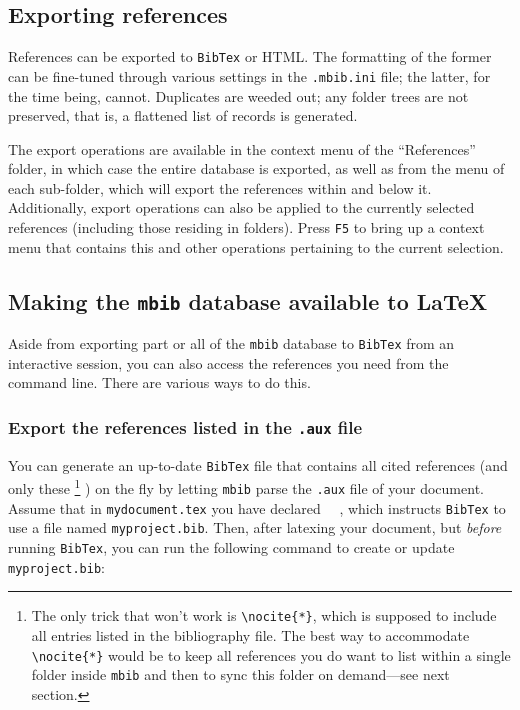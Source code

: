 \documentclass[10pt]{article}
\newcommand*{\mbib}{\texttt{mbib}\xspace}
\newcommand*{\bibtex}{\texttt{BibTex}\xspace}
\newcommand*{\key}[1]{\texttt{#1}\xspace}
\begin{document}
\subsection{Exporting references}
\label{sec:export}


References can be exported to \bibtex or HTML. The formatting of the former can be fine-tuned through various settings in the \texttt{.mbib.ini} file; the latter, for the time being, cannot. Duplicates are weeded out; any folder trees are not preserved, that is, a flattened list of records is generated. 

The export operations are available in the context menu of the ``References'' folder, in which case the entire database is exported, as well as from the menu of each sub-folder, which will export the references within and below it. Additionally, export operations can also be applied to the currently selected references (including those residing in folders). Press \key{F5} to bring up a context menu that contains this and other operations pertaining to the current selection.

\subsection{Making the \mbib database available to \LaTeX{}}

Aside from exporting part or all of the \mbib database to \bibtex from an interactive session, you can also access the references you need from the command line. There are various ways to do this. 

\subsubsection{Export the references listed in the \texttt{.aux} file}

You can generate an up-to-date \bibtex file that contains all cited references (and only these%
%
\footnote{The only trick that won't work is \texttt{\textbackslash nocite\{*\}}, which is supposed to include all entries listed in the bibliography file. The best way to accommodate \texttt{\textbackslash nocite\{*\}} would be to keep all references you do want to list within a single folder inside \mbib and then to sync this folder on demand---see next section.}%
%
) on the fly by letting \mbib parse the \texttt{.aux} file of your document. Assume that in \texttt{mydocument.tex} you have declared ~~, which instructs \bibtex to use a file named \texttt{myproject.bib}. Then, after latexing your document, but \emph{before} running \bibtex, you can run the following command to create or update
\texttt{myproject.bib}:
\end{document}
